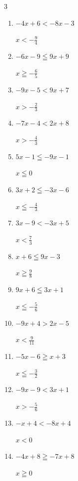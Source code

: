 \begin{multicols}{3}
\begin{enumerate}
  \item $-4x+6<-8x-3$

        $\displaystyle x<-\frac{9}{4}$

\columnbreak %

  \item $-6x-9\leqq 9x+9$

        $\displaystyle x\geqq -\frac{6}{5}$

  \item $-9x-5<9x+7$

        $\displaystyle x>-\frac{2}{3}$

  \item $-7x-4<2x+8$

        $\displaystyle x>-\frac{4}{3}$

  \item $5x-1\leqq -9x-1$

        $\displaystyle x\leqq 0$

  \item $3x+2\leqq -3x-6$

        $\displaystyle x\leqq -\frac{4}{3}$

  \item $3x-9<-3x+5$

        $\displaystyle x<\frac{7}{3}$

  \item $x+6\leqq 9x-3$

        $\displaystyle x\geqq \frac{9}{8}$

  \item $9x+6\leqq 3x+1$

        $\displaystyle x\leqq -\frac{5}{6}$

  \item $-9x+4>2x-5$

        $\displaystyle x<\frac{9}{11}$

  \item $-5x-6\geqq x+3$

        $\displaystyle x\leqq -\frac{3}{2}$

  \item $-9x-9<3x+1$

        $\displaystyle x>-\frac{5}{6}$

  \item $-x+4<-8x+4$

        $\displaystyle x<0$

  \item $-4x+8\geqq -7x+8$

        $\displaystyle x\geqq 0$


\end{enumerate}
\end{multicols}
